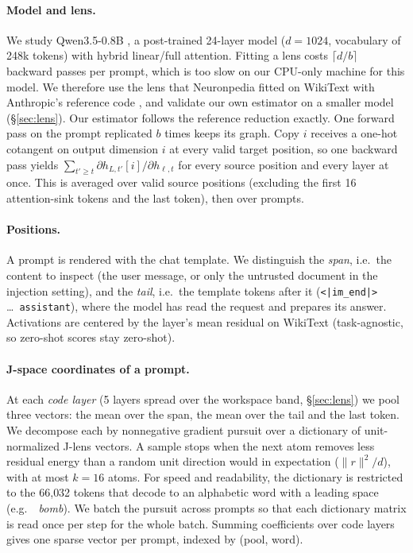 \paragraph{Model and lens.} We study Qwen3.5-0.8B \citep{qwen35}, a post-trained 24-layer
model ($d=1024$, vocabulary of 248k tokens) with hybrid linear/full attention. Fitting a lens
costs $\lceil d/b\rceil$ backward passes per prompt, which is too slow on our CPU-only
machine for this model. We therefore use the lens that Neuronpedia fitted on WikiText with
Anthropic's reference code \citep{neuronpedialenses,jlensrepo}, and validate our own
estimator on a smaller model (\S\ref{sec:lens}). Our estimator follows the reference
reduction exactly. One forward pass on the prompt replicated $b$ times keeps its graph. Copy
$i$ receives a one-hot cotangent on output dimension $i$ at every valid target position, so
one backward pass yields $\sum_{t'\ge t}\partial h_{L,t'}[i]/\partial h_{\ell,t}$ for every
source position and every layer at once. This is averaged over valid source positions
(excluding the first 16 attention-sink tokens and the last token), then over prompts.

\paragraph{Positions.} A prompt is rendered with the chat template. We distinguish the
\emph{span}, i.e.\ the content to inspect (the user message, or only the untrusted document
in the injection setting), and the \emph{tail}, i.e.\ the template tokens after it
(\texttt{<|im\_end|>} \dots\ \texttt{assistant}), where the model has read the request and
prepares its answer. Activations are centered by the layer's mean residual on WikiText
(task-agnostic, so zero-shot scores stay zero-shot).

\paragraph{J-space coordinates of a prompt.} At each \emph{code layer} (5 layers spread
over the workspace band, \S\ref{sec:lens}) we pool three vectors: the mean over the span,
the mean over the tail and the last token. We decompose each by nonnegative gradient pursuit
over a dictionary of unit-normalized J-lens vectors. A sample stops when the next atom
removes less residual energy than a random unit direction would in expectation
($\|r\|^2/d$), with at most $k=16$ atoms. For speed and readability, the dictionary is
restricted to the 66{,}032 tokens that decode to an alphabetic word with a leading space
(e.g.\ \textit{\ bomb}). We batch the pursuit across prompts so that each dictionary matrix
is read once per step for the whole batch. Summing coefficients over code layers gives one
sparse vector per prompt, indexed by (pool, word).

